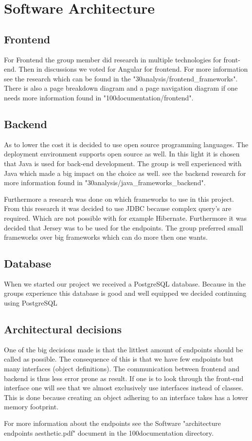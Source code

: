 
\chapter{Software Architecture}

\section{Frontend}

For Frontend the group member did research in multiple technologies for front-end. Then in discussions we voted for Angular for frontend. For more information see the research which can be found in the "30analysis/frontend\_frameworks". There is also a page breakdown diagram and a page navigation diagram if one needs more information found in "100documentation/frontend".

\section{Backend}

As to lower the cost it is decided to use open source programming languages. The deployment environment supports open source as well. In this light it is chosen that Java is used for back-end development. The group is well experienced with Java which made a big impact on the choice as well. see the backend research for more information found in "30analysis/java\_frameworks\_backend".

Furthermore a research was done on which frameworks to use in this project. From this research it was decided to use JDBC because complex query's are required. Which are not possible with for example Hibernate. Furthermore it was decided that Jersey was to be used for the endpoints. The group preferred small frameworks over big frameworks which can do more then one wants.

\section{Database}

When we started our project we received a PostgreSQL database. Because in the groups experience this database is good and well equipped we decided continuing using PostgreSQL


\section{Architectural decisions}

One of the big decisions made is that the littlest amount of endpoints should be called as possible. The consequence of this is that we have few endpoints but many interfaces (object definitions). The communication between frontend and backend is thus less error prone as result. If one is to look through the front-end interface one will see that we almost exclusively use interfaces instead of classes. This is done because creating an object adhering to an interface takes has a lower memory footprint.

For more information about the endpoints see the Software "architecture endpoints aesthetic.pdf" document in the 100documentation directory.